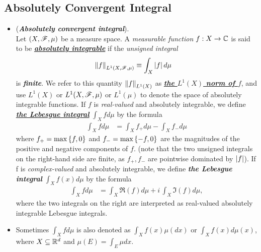 \documentclass[11pt]{article}
\begin{document}
\subsection{Absolutely Convergent Integral}
\begin{itemize}
\item \begin{definition} (\emph{\textbf{Absolutely convergent integral}}). \\
Let $(X,{\mathscr F}, \mu)$ be a measure space. A \emph{measurable function} $f : X \rightarrow {\mathbb C}$ is said to be \underline{\emph{\textbf{absolutely integrable}}} if the \emph{unsigned integral} 
\begin{align*}
\left\|f\right\|_{L^{1}(X, {\mathscr F}, \mu)} &\equiv \int_{X}\left\lvert f \right\rvert d\mu 
\end{align*}
is \emph{\textbf{finite}}. We refer to this quantity $\left\|f\right\|_{L^{1}(X)}$ as \underline{\emph{\textbf{the $L^1(X)$ norm of $f$}}}, and use $L^1(X)$ or $L^1(X, {\mathscr F}, \mu)$ or $L^1(\mu)$ to denote the space of absolutely integrable functions. If $f$ is \emph{real-valued} and absolutely integrable, we define \underline{\emph{\textbf{the Lebesgue integral}}} $\int_{X}f d\mu$ by the formula
\begin{align*}
\int_{X}f d\mu &= \int_{X}f_{+}d\mu - \int_{X}f_{-}d\mu
\end{align*}
where $f_{+} = \max\left\{f, 0\right\}$ and $f_{-} = \max\left\{-f, 0\right\}$ are the magnitudes of the positive and negative components of $f$. (note that the two unsigned integrals on the right-hand side are finite, as $f_+, f_{-}$ are pointwise dominated by $\left\lvert f \right\rvert$). If f is \emph{complex-valued} and absolutely integrable, we define \emph{\textbf{the Lebesgue integral}} $\int_{X}f(x)d\mu$ by the formula
\begin{align*}
\int_{X}f d\mu &= \int_{X}\Re( f ) d\mu  + i\,\int_{X}\Im(f) d\mu,
\end{align*}
where the two integrals on the right are interpreted as real-valued absolutely integrable Lebesgue integrals.
\end{definition}

\item \begin{remark}
 Sometimes $\int_{X}f d\mu $ is also denoted as $\int_{X}f(x) \mu(dx) $ or $\int_{X}f(x) d\mu(x)$, where $X\subseteq {\mathbb R}^{d}$ and $\mu(E) = \int_{E}\mu dx$.
\end{remark}


\end{itemize}
\end{document}
